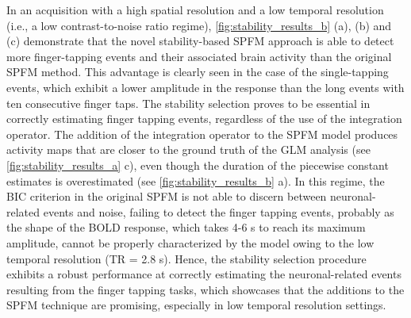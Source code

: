 In an acquisition with a high spatial resolution and a low temporal resolution
(i.e., a low contrast-to-noise ratio regime), \cref{fig:stability_results_b}
(a), (b) and (c) demonstrate that the novel stability-based SPFM approach is
able to detect more finger-tapping events and their associated brain activity
than the original SPFM method. This advantage is clearly seen in the case of the
single-tapping events, which exhibit a lower amplitude in the response than the
long events with ten consecutive finger taps. The stability selection proves to
be essential in correctly estimating finger tapping events, regardless of the
use of the integration operator. The addition of the integration operator to the
SPFM model produces activity maps that are closer to the ground truth of the GLM
analysis (see \cref{fig:stability_results_a} c), even though the duration of
the piecewise constant estimates is overestimated (see
\cref{fig:stability_results_b} a). In this regime, the BIC criterion in the
original SPFM is not able to discern between neuronal-related events and noise,
failing to detect the finger tapping events, probably as the shape of the BOLD
response, which takes 4-6 s to reach its maximum amplitude, cannot be properly
characterized by the model owing to the low temporal resolution (TR = 2.8 s).
Hence, the stability selection procedure exhibits a robust performance at
correctly estimating the neuronal-related events resulting from the finger
tapping tasks, which showcases that the additions to the SPFM technique are
promising, especially in low temporal resolution settings.
